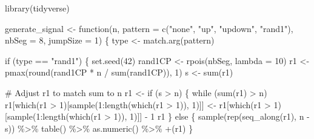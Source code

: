 \documentclass[
  letterpaper,
  DIV=11,
  numbers=noendperiod]{scrreprt}
\newenvironment{Shaded}{\begin{snugshade}}{\end{snugshade}}
\newcommand{\AttributeTok}[1]{\textcolor[rgb]{0.40,0.45,0.13}{#1}}
\newcommand{\CommentTok}[1]{\textcolor[rgb]{0.37,0.37,0.37}{#1}}
\newcommand{\ControlFlowTok}[1]{\textcolor[rgb]{0.00,0.23,0.31}{#1}}
\newcommand{\DecValTok}[1]{\textcolor[rgb]{0.68,0.00,0.00}{#1}}
\newcommand{\FunctionTok}[1]{\textcolor[rgb]{0.28,0.35,0.67}{#1}}
\newcommand{\NormalTok}[1]{\textcolor[rgb]{0.00,0.23,0.31}{#1}}
\newcommand{\OtherTok}[1]{\textcolor[rgb]{0.00,0.23,0.31}{#1}}
\newcommand{\SpecialCharTok}[1]{\textcolor[rgb]{0.37,0.37,0.37}{#1}}
\newcommand{\StringTok}[1]{\textcolor[rgb]{0.13,0.47,0.30}{#1}}
\begin{document}
\begin{Shaded}
\begin{Highlighting}[]
\FunctionTok{library}\NormalTok{(tidyverse)}

\NormalTok{generate\_signal }\OtherTok{\textless{}{-}} \ControlFlowTok{function}\NormalTok{(n, }\AttributeTok{pattern =} \FunctionTok{c}\NormalTok{(}\StringTok{"none"}\NormalTok{, }\StringTok{"up"}\NormalTok{, }\StringTok{"updown"}\NormalTok{, }\StringTok{"rand1"}\NormalTok{), }\AttributeTok{nbSeg =} \DecValTok{8}\NormalTok{, }\AttributeTok{jumpSize =} \DecValTok{1}\NormalTok{) \{}
\NormalTok{  type }\OtherTok{\textless{}{-}} \FunctionTok{match.arg}\NormalTok{(pattern)}

  \ControlFlowTok{if}\NormalTok{ (type }\SpecialCharTok{==} \StringTok{"rand1"}\NormalTok{) \{}
    \FunctionTok{set.seed}\NormalTok{(}\DecValTok{42}\NormalTok{)}
\NormalTok{    rand1CP }\OtherTok{\textless{}{-}} \FunctionTok{rpois}\NormalTok{(nbSeg, }\AttributeTok{lambda =} \DecValTok{10}\NormalTok{)}
\NormalTok{    r1 }\OtherTok{\textless{}{-}} \FunctionTok{pmax}\NormalTok{(}\FunctionTok{round}\NormalTok{(rand1CP }\SpecialCharTok{*}\NormalTok{ n }\SpecialCharTok{/} \FunctionTok{sum}\NormalTok{(rand1CP)), }\DecValTok{1}\NormalTok{)}
\NormalTok{    s }\OtherTok{\textless{}{-}} \FunctionTok{sum}\NormalTok{(r1)}

    \CommentTok{\# Adjust r1 to match sum to n}
\NormalTok{    r1 }\OtherTok{\textless{}{-}} \ControlFlowTok{if}\NormalTok{ (s }\SpecialCharTok{\textgreater{}}\NormalTok{ n) \{}
      \ControlFlowTok{while}\NormalTok{ (}\FunctionTok{sum}\NormalTok{(r1) }\SpecialCharTok{\textgreater{}}\NormalTok{ n) r1[}\FunctionTok{which}\NormalTok{(r1 }\SpecialCharTok{\textgreater{}} \DecValTok{1}\NormalTok{)[}\FunctionTok{sample}\NormalTok{(}\DecValTok{1}\SpecialCharTok{:}\FunctionTok{length}\NormalTok{(}\FunctionTok{which}\NormalTok{(r1 }\SpecialCharTok{\textgreater{}} \DecValTok{1}\NormalTok{)), }\DecValTok{1}\NormalTok{)]] }\OtherTok{\textless{}{-}}\NormalTok{ r1[}\FunctionTok{which}\NormalTok{(r1 }\SpecialCharTok{\textgreater{}} \DecValTok{1}\NormalTok{)[}\FunctionTok{sample}\NormalTok{(}\DecValTok{1}\SpecialCharTok{:}\FunctionTok{length}\NormalTok{(}\FunctionTok{which}\NormalTok{(r1 }\SpecialCharTok{\textgreater{}} \DecValTok{1}\NormalTok{)), }\DecValTok{1}\NormalTok{)]] }\SpecialCharTok{{-}} \DecValTok{1}
\NormalTok{      r1}
\NormalTok{    \} }\ControlFlowTok{else}\NormalTok{ \{}
      \FunctionTok{sample}\NormalTok{(}\FunctionTok{rep}\NormalTok{(}\FunctionTok{seq\_along}\NormalTok{(r1), n }\SpecialCharTok{{-}}\NormalTok{ s)) }\SpecialCharTok{\%\textgreater{}\%} \FunctionTok{table}\NormalTok{() }\SpecialCharTok{\%\textgreater{}\%} \FunctionTok{as.numeric}\NormalTok{() }\SpecialCharTok{\%\textgreater{}\%} \StringTok{\textasciigrave{}}\AttributeTok{+}\StringTok{\textasciigrave{}}\NormalTok{(r1)}
\NormalTok{    \}}


\end{Highlighting}
\end{Shaded}
\end{document}
